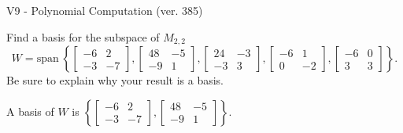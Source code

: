 \begin{exercise}
  \begin{exerciseTitle}V9 - Polynomial Computation (ver. 385)\end{exerciseTitle}
  \begin{exerciseStatement}
    Find a basis for the subspace of \(M_{2,2}\) 
\[W=\mathrm{span}\ \left\{\left[\begin{array}{cc}
-6 & 2 \\
-3 & -7
\end{array}\right] , \left[\begin{array}{cc}
48 & -5 \\
-9 & 1
\end{array}\right] , \left[\begin{array}{cc}
24 & -3 \\
-3 & 3
\end{array}\right] , \left[\begin{array}{cc}
-6 & 1 \\
0 & -2
\end{array}\right] , \left[\begin{array}{cc}
-6 & 0 \\
3 & 3
\end{array}\right]\right\}.\]
 Be sure to explain why your result is a basis.


  \end{exerciseStatement}
  \begin{exerciseAnswer}
   A basis of \(W\) is  \(\left\{\left[\begin{array}{cc}
-6 & 2 \\
-3 & -7
\end{array}\right] , \left[\begin{array}{cc}
48 & -5 \\
-9 & 1
\end{array}\right]\right\}\).
  


  \end{exerciseAnswer}
\end{exercise}